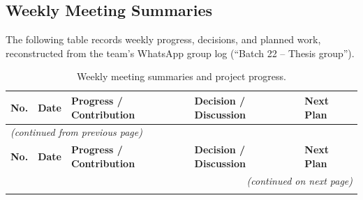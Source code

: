 \documentclass{iutbscthesis}
\begin{document}
\begin{appendices}
\chapter{Weekly Meeting Summaries}
The following table records weekly progress, decisions, and planned work, reconstructed from the
team's WhatsApp group log (``Batch 22 -- Thesis group'').

\begingroup
\small
\begin{longtable}{@{}p{}p{}p{}p{}p{}@{}}
\caption{Weekly meeting summaries and project progress.}
\label{tab:weekly-summary}\\
\hline
\textbf{No.} & \textbf{Date} & \textbf{Progress / Contribution} & \textbf{Decision / Discussion} &
\textbf{Next Plan} \\
\hline
\endfirsthead

\multicolumn{5}{l}{\small\textit{(continued from previous page)}} \\
\hline
\textbf{No.} & \textbf{Date} & \textbf{Progress / Contribution} & \textbf{Decision / Discussion} &
\textbf{Next Plan} \\
\hline
\endhead

\hline
\multicolumn{5}{r}{\small\textit{(continued on next page)}} \\
\endfoot

\hline
\endlastfoot


\end{longtable}
\end{appendices}
\end{document}
